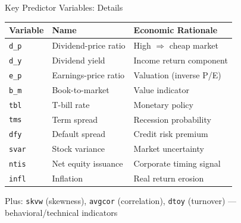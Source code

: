 \documentclass[10pt]{beamer}
\begin{document}
\begin{frame}{Key Predictor Variables: Details}

  \begin{center}
  \begin{tabular}{llp{5cm}}
    \toprule
    \textbf{Variable} & \textbf{Name} & \textbf{Economic Rationale} \\
    \midrule
    \texttt{d\_p} & Dividend-price ratio & High $\Rightarrow$ cheap market \\
    \texttt{d\_y} & Dividend yield & Income return component \\
    \texttt{e\_p} & Earnings-price ratio & Valuation (inverse P/E) \\
    \texttt{b\_m} & Book-to-market & Value indicator \\
    \texttt{tbl} & T-bill rate & Monetary policy \\
    \texttt{tms} & Term spread & Recession probability \\
    \texttt{dfy} & Default spread & Credit risk premium \\
    \texttt{svar} & Stock variance & Market uncertainty \\
    \texttt{ntis} & Net equity issuance & Corporate timing signal \\
    \texttt{infl} & Inflation & Real return erosion \\
    \bottomrule
  \end{tabular}
  \end{center}

  \vspace{0.3em}
  Plus: \texttt{skvw} (skewness), \texttt{avgcor} (correlation), \texttt{dtoy} (turnover) --- behavioral/technical indicators
\end{frame}

\end{document}
